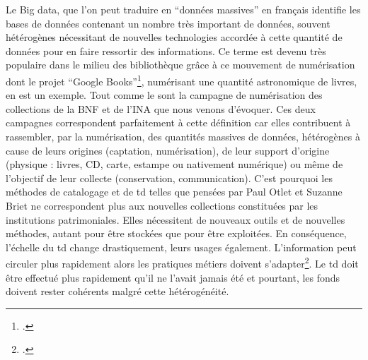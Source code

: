 
Le Big data, que l'on peut traduire en \enquote{données massives} en français identifie les bases de données contenant un nombre très important de données, souvent hétérogènes nécessitant de nouvelles technologies accordée à cette quantité de données pour en faire ressortir des informations. Ce terme est devenu très populaire dans le milieu des bibliothèque grâce à ce mouvement de numérisation dont le projet \enquote{Google Books}\footcite[]{demauro2016}, numérisant une quantité astronomique de livres, en est un exemple. Tout comme le sont la campagne de numérisation des collections de la BNF et de l'INA que nous venons d'évoquer. Ces deux campagnes correspondent parfaitement à cette définition car elles contribuent à rassembler, par la numérisation, des quantités massives de données, hétérogènes à cause de leurs origines (captation, numérisation), de leur support d'origine (physique : livres, CD, carte, estampe ou nativement numérique) ou même de l'objectif de leur collecte (conservation, communication). C'est pourquoi les méthodes de catalogage et de \gls{td} telles que pensées par Paul Otlet et Suzanne Briet ne correspondent plus aux nouvelles collections constituées par les institutions patrimoniales. Elles nécessitent de nouveaux outils et de nouvelles méthodes, autant pour être stockées que pour être exploitées. En conséquence, l'échelle du \gls{td} change drastiquement, leurs usages également. L'information peut circuler plus rapidement alors les pratiques métiers doivent s'adapter\footcite[][145]{caporiondo-prost2026}. Le \gls{td} doit être effectué plus rapidement qu'il ne l'avait jamais été et pourtant, les fonds doivent rester cohérents malgré cette hétérogénéité. 


